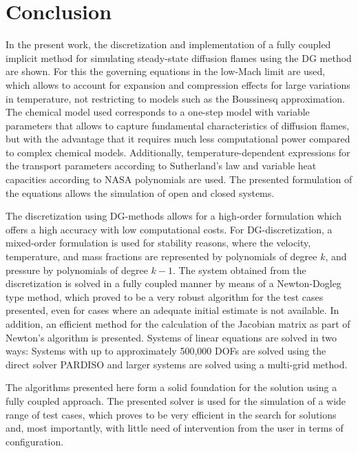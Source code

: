 \chapter{Conclusion}	\label{ch:conclusion}

In the present work, the discretization and implementation of a fully coupled implicit method for simulating steady-state diffusion flames using the DG method are shown. For this the governing equations in the low-Mach limit are used, which allows to account for expansion and compression effects for large variations in temperature, not restricting to models such as the Boussinesq approximation. The chemical model used corresponds to a one-step model with variable parameters that allows to capture fundamental characteristics of diffusion flames, but with the advantage that it requires much less computational power compared to complex chemical models.  Additionally, temperature-dependent expressions for the transport parameters according to Sutherland's law and variable heat capacities according to NASA polynomials are used. The presented formulation of the equations allows the simulation of open and closed systems. 

The discretization using DG-methods allows for a high-order formulation which offers a high accuracy with low computational costs. For DG-discretization, a mixed-order formulation is used for stability reasons, where the velocity, temperature, and mass fractions are represented by polynomials of degree $k$, and pressure by polynomials of degree $k-1$. The system obtained from the discretization is solved in a fully coupled manner by means of a Newton-Dogleg type method, which proved to be a very robust algorithm for the test cases presented, even for cases where an adequate initial estimate is not available. In addition, an efficient method for the calculation of the Jacobian matrix as part of Newton's algorithm is presented. Systems of linear equations are solved in two ways: Systems with up to approximately 500,000 \gls{DOFs} are solved using the direct solver \gls{PARDISO} and larger systems are solved using a multi-grid method. 

The algorithms presented here form a solid foundation for the solution using a fully coupled approach. The presented solver is used for the simulation of a wide range of test cases, which proves to be very efficient in the search for solutions and, most importantly, with little need of intervention from the user in terms of configuration.

